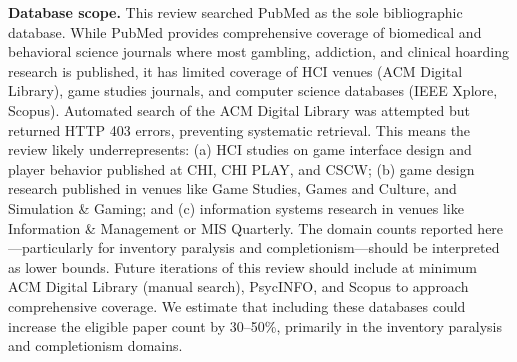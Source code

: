 \documentclass[12pt]{article}
\begin{document}
\textbf{Database scope.} This review searched PubMed as the sole bibliographic database. While PubMed provides comprehensive coverage of biomedical and behavioral science journals where most gambling, addiction, and clinical hoarding research is published, it has limited coverage of HCI venues (ACM Digital Library), game studies journals, and computer science databases (IEEE Xplore, Scopus). Automated search of the ACM Digital Library was attempted but returned HTTP 403 errors, preventing systematic retrieval. This means the review likely underrepresents: (a) HCI studies on game interface design and player behavior published at CHI, CHI PLAY, and CSCW; (b) game design research published in venues like Game Studies, Games and Culture, and Simulation \& Gaming; and (c) information systems research in venues like Information \& Management or MIS Quarterly. The domain counts reported here---particularly for inventory paralysis and completionism---should be interpreted as lower bounds. Future iterations of this review should include at minimum ACM Digital Library (manual search), PsycINFO, and Scopus to approach comprehensive coverage. We estimate that including these databases could increase the eligible paper count by 30--50\%, primarily in the inventory paralysis and completionism domains.
\end{document}
